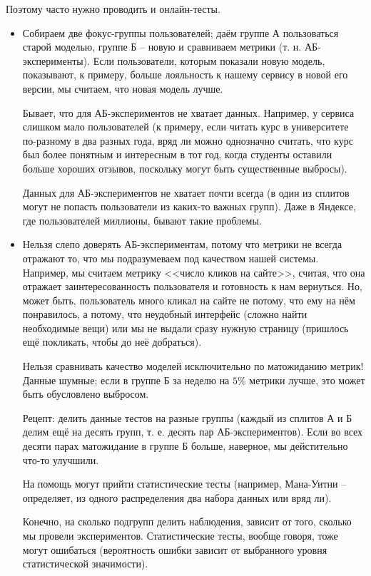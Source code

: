 \documentclass[main.tex]{subfiles}
\begin{document}
Поэтому часто нужно проводить и онлайн-тесты.
\begin{itemize}[noitemsep]
	\item Собираем две фокус-группы пользователей; даём группе А пользоваться старой моделью, группе Б -- новую и сравниваем метрики (т. н. АБ-эксперименты).
	Если пользователи, которым показали новую модель, показывают, к примеру, больше лояльность к нашему сервису в новой его версии, мы считаем, что новая модель лучше.
	
	
	Бывает, что для АБ-экспериментов не хватает данных.
	Например, у сервиса слишком мало пользователей (к примеру, если читать курс в университете по-разному в два разных года, вряд ли можно однозначно считать, что курс был более понятным и интересным в тот год, когда студенты оставили больше хороших отзывов, поскольку могут быть существенные выбросы).
	
	Данных для АБ-экспериментов не хватает почти всегда (в один из сплитов могут не попасть пользователи из каких-то важных групп).
	Даже в Яндексе, где пользователей миллионы, бывают такие проблемы.
	\item Нельзя слепо доверять АБ-экспериментам, потому что метрики не всегда отражают то, что мы подразумеваем под качеством нашей системы.
	Например, мы считаем метрику <<число кликов на сайте>>, считая, что она отражает заинтересованность пользователя и готовность к нам вернуться.
	Но, может быть, пользователь много кликал на сайте не потому, что ему на нём понравилось, а потому, что неудобный интерфейс (сложно найти необходимые вещи) или мы не выдали сразу нужную страницу (пришлось ещё покликать, чтобы до неё добраться).
	
	Нельзя сравнивать качество моделей исключительно по матожиданию метрик!
	Данные шумные; если в группе Б за неделю на $ 5\% $ метрики лучше, это может быть обусловлено выбросом.
	
	Рецепт: делить данные тестов на разные группы (каждый из сплитов А и Б делим ещё на десять групп, т. е. десять пар АБ-экспериментов).
	Если во всех десяти парах матожидание в группе Б больше, наверное, мы дейстительно что-то улучшили.
	
	На помощь могут прийти статистические тесты (например, Мана-Уитни -- определяет, из одного распределения два набора данных или вряд ли).
	
	Конечно, на сколько подгрупп делить наблюдения, зависит от того, сколько мы провели экспериментов.
	Статистические тесты, вообще говоря, тоже могут ошибаться (вероятность ошибки зависит от выбранного уровня статистической значимости).
	

\end{itemize}
\end{document}
